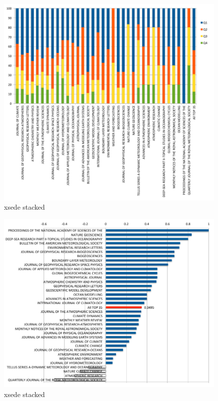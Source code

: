 \documentclass{sig-alternate}
\begin{document}
\begin{figure}[htb] 
  \centering 
    \includegraphics[width=1.0\textwidth]{images-new/ncar-b.pdf} 
  \caption{xsede stacked}\label{F:xsede-stacked} 
\end{figure} 

\begin{figure}[htb] 
  \centering 
    \includegraphics[width=1.0\textwidth]{images-new/ncar-c.pdf} 
  \caption{xsede stacked}\label{F:xsede-stacked} 
\end{figure} 
\end{document}
